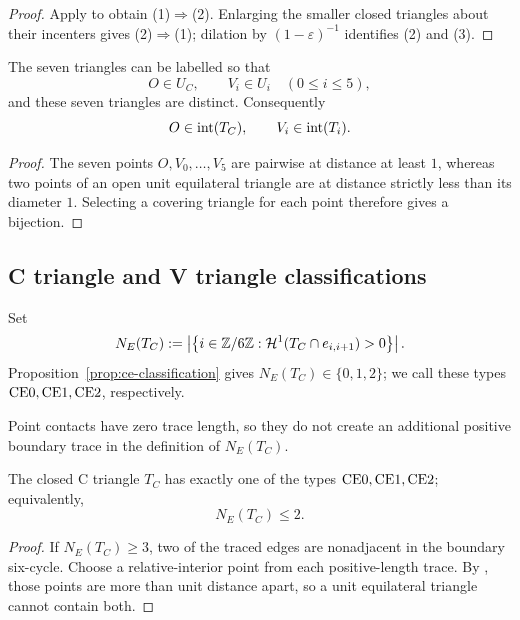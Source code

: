 \begin{proof}
Apply  to obtain (1)$\Rightarrow$(2).
Enlarging the smaller closed triangles about their incenters gives
(2)$\Rightarrow$(1); dilation by $(1-\varepsilon)^{-1}$ identifies
(2) and (3).
\end{proof}

\begin{lemma}
\label{lem:distinct-roles}
The seven triangles can be labelled so that
\[
 O\in U_C,\qquad V_i\in U_i\quad(0\le i\le5),
\]
and these seven triangles are distinct.  Consequently
\[
 O\in\mathrm{int}(T_C),\qquad V_i\in\mathrm{int}(T_i).
\]
\end{lemma}

\begin{proof}
The seven points $O,V_0,\ldots,V_5$ are pairwise at distance at least $1$,
whereas two points of an open unit equilateral triangle are at distance
strictly less than its diameter $1$.  Selecting a covering triangle for each
point therefore gives a bijection.
\end{proof}

\subsection{C triangle and V triangle classifications}

Set
\[
 N_E(T_C):=
 \left\lvert\left\{i\in\mathbb Z/6\mathbb Z:
 \mathcal H^1(T_C\cap e_{i,i+1})>0\right\}\right\rvert.
\]
Proposition~\ref{prop:ce-classification} gives $N_E(T_C)\in\{0,1,2\}$;
we call these types $\mathrm{CE0},\mathrm{CE1},\mathrm{CE2}$, respectively.



Point contacts have zero trace length, so they do not create an additional
positive boundary trace in the definition of $N_E(T_C)$.

\begin{proposition}
\label{prop:ce-classification}
The closed C triangle $T_C$ has exactly one of the types
$\mathrm{CE0},\mathrm{CE1},\mathrm{CE2}$;
equivalently,
\[
 N_E(T_C)\le2.
\]
\end{proposition}

\begin{proof}
If $N_E(T_C)\ge3$, two of the traced edges are nonadjacent in the boundary
six-cycle.  Choose a relative-interior point from each positive-length trace.
By , those points are more than unit
distance apart, so a unit equilateral triangle cannot contain both.
\end{proof}

